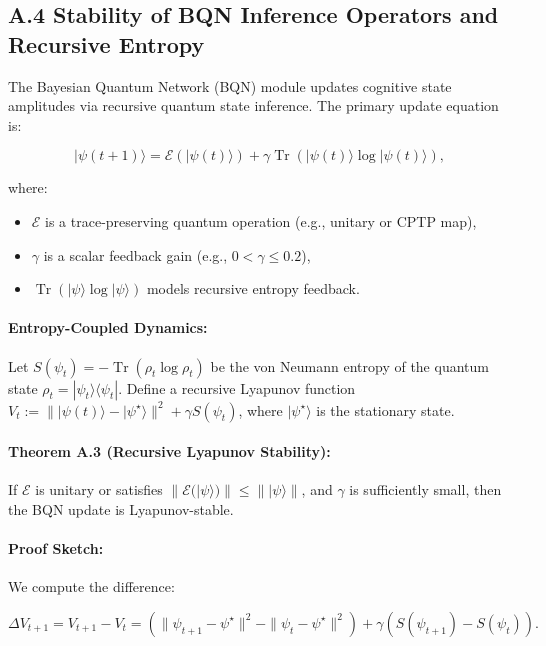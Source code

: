\appendix
\subsection*{A.4 Stability of BQN Inference Operators and Recursive Entropy}

The Bayesian Quantum Network (BQN) module updates cognitive state amplitudes via recursive quantum state inference. The primary update equation is:

\[
|\psi(t+1)\rangle = \mathcal{E}(|\psi(t)\rangle) + \gamma \operatorname{Tr}(|\psi(t)\rangle \log |\psi(t)\rangle),
\]

where:
\begin{itemize}
    \item \(\mathcal{E}\) is a trace-preserving quantum operation (e.g., unitary or CPTP map),
    \item \(\gamma\) is a scalar feedback gain (e.g., \(0 < \gamma \leq 0.2\)),
    \item \(\operatorname{Tr}(|\psi\rangle \log |\psi\rangle)\) models recursive entropy feedback.
\end{itemize}

\paragraph{Entropy-Coupled Dynamics:}
Let \(S(\psi_t) = -\operatorname{Tr}(\rho_t \log \rho_t)\) be the von Neumann entropy of the quantum state \(\rho_t = |\psi_t\rangle \langle \psi_t|\). Define a recursive Lyapunov function \(V_t := \| |\psi(t)\rangle - |\psi^\star\rangle \|^2 + \gamma S(\psi_t)\), where \(|\psi^\star\rangle\) is the stationary state.

\paragraph{Theorem A.3 (Recursive Lyapunov Stability):}
If \(\mathcal{E}\) is unitary or satisfies \(\|\mathcal{E}(|\psi\rangle)\| \leq \| |\psi\rangle \|\), and \(\gamma\) is sufficiently small, then the BQN update is Lyapunov-stable.

\paragraph{Proof Sketch:}
We compute the difference:

\[
\Delta V_{t+1} = V_{t+1} - V_t = \left(\| \psi_{t+1} - \psi^\star \|^2 - \| \psi_t - \psi^\star \|^2 \right) + \gamma (S(\psi_{t+1}) - S(\psi_t)).
\]

